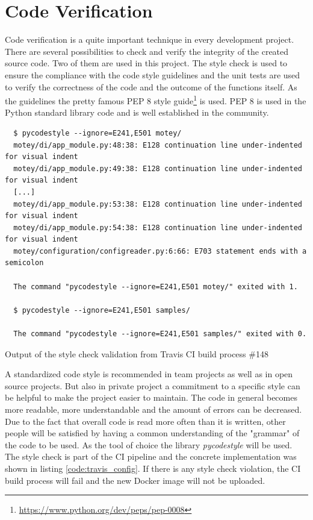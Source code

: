 \section{Code Verification}
\label{section:code-verification}
Code verification is a quite important technique in every development project.
There are several possibilities to check and verify the integrity of the created source code.
Two of them are used in this project.
The style check is used to ensure the compliance with the code style guidelines and the unit tests are used to verify the correctness of the code and the outcome of the functions itself.
As the guidelines the pretty famous \ac{PEP} 8 style guide\footnote{\url{https://www.python.org/dev/peps/pep-0008}} is used.
\ac{PEP} 8 is used in the Python standard library code and is well established in the community.\newline

\begin{listing}[H]
  \begin{verbatim}
  $ pycodestyle --ignore=E241,E501 motey/
  motey/di/app_module.py:48:38: E128 continuation line under-indented for visual indent
  motey/di/app_module.py:49:38: E128 continuation line under-indented for visual indent
  [...]
  motey/di/app_module.py:53:38: E128 continuation line under-indented for visual indent
  motey/di/app_module.py:54:38: E128 continuation line under-indented for visual indent
  motey/configuration/configreader.py:6:66: E703 statement ends with a semicolon

  The command "pycodestyle --ignore=E241,E501 motey/" exited with 1.

  $ pycodestyle --ignore=E241,E501 samples/

  The command "pycodestyle --ignore=E241,E501 samples/" exited with 0.
  \end{verbatim}
  \caption[Output of the style check validation from Travis CI build process \#148]{Output of the style check validation from Travis CI build process \#148\autocite{Travis:Build:148}}
  \label{code:style_check_validation}
\end{listing}

A standardized code style is recommended in team projects as well as in open source projects.
But also in private project a commitment to a specific style can be helpful to make the project easier to maintain.
The code in general becomes more readable, more understandable and the amount of errors can be decreased.
Due to the fact that overall code is read more often than it is written, other people will be satisfied by having a common understanding of the "grammar" of the code to be used.
As the tool of choice the library \textit{pycodestyle} will be used.
The style check is part of the \ac{CI} pipeline and the concrete implementation was shown in listing \ref{code:travis_config}.
If there is any style check violation, the \ac{CI} build process will fail and the new Docker image will not be uploaded.\newline

